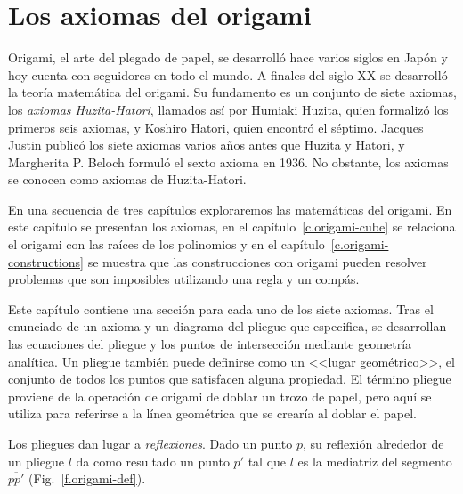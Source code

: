 
\chapter{Los axiomas del origami}\label{c.origami-axioms}


Origami, el arte del plegado de papel, se desarrolló hace varios siglos en Japón y hoy cuenta con seguidores en todo el mundo. A finales del siglo XX se desarrolló la teoría matemática del origami. Su fundamento es un conjunto de siete axiomas, los \emph{axiomas Huzita-Hatori}, llamados así por Humiaki Huzita, quien formalizó los primeros seis axiomas, y Koshiro Hatori, quien encontró el séptimo. Jacques Justin publicó los siete axiomas varios años antes que Huzita y Hatori, y Margherita P. Beloch formuló el sexto axioma en 1936. No obstante, los axiomas se conocen como axiomas de Huzita-Hatori.

En una secuencia de tres capítulos exploraremos las matemáticas del origami. En este capítulo se presentan los axiomas, en el capítulo~\ref{c.origami-cube} se relaciona el origami con las raíces de los polinomios y en el capítulo~\ref{c.origami-constructions} se muestra que las construcciones con origami pueden resolver problemas que son imposibles utilizando una regla y un compás.
 
Este capítulo contiene una sección para cada uno de los siete axiomas. Tras el enunciado de un axioma y un diagrama del pliegue que especifica, se desarrollan las ecuaciones del pliegue y los puntos de intersección mediante geometría analítica. Un pliegue también puede definirse como un <<lugar geométrico>>, el conjunto de todos los puntos que satisfacen alguna propiedad. El término pliegue proviene de la operación de origami de doblar un trozo de papel, pero aquí se utiliza para referirse a la línea geométrica que se crearía al doblar el papel.

Los pliegues dan lugar a \emph{reflexiones}. Dado un punto $p$, su reflexión alrededor de un pliegue $l$ da como resultado un punto $p'$ tal que $l$ es la mediatriz del segmento $\overline{pp'}$ (Fig.~\ref{f.origami-def}).

